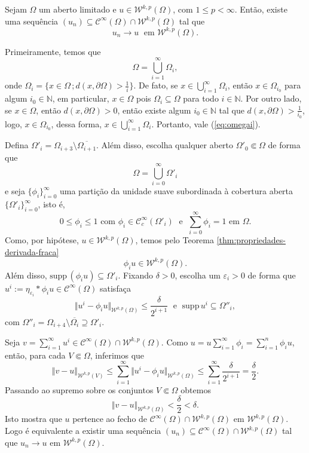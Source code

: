 \documentclass[a4paper, 11pt]{book}
\theoremstyle{definition}
\newcommand{\bN}{\mathbb{N}}
\newcommand{\cC}{\mathcal{C}}
\newcommand{\cW}{\mathcal{W}}
\newcommand{\supp}{\mathrm{supp}\,}
\begin{document}
\begin{tbox} \label{thm:aprox-2}
    Sejam $\Omega$ um aberto limitado e $u \in \cW^{k,p}(\Omega)$, com $1 \leqslant p < \infty$.
    Então, existe uma sequência $(u_n) \subseteq \cC^{\infty}(\Omega) \cap \cW^{k,p}(\Omega)$ tal que
    \[
        u_n \to u \;\text{ em } \cW^{k,p}(\Omega).
    \] 
\end{tbox}
\begin{prf}
    Primeiramente, temos que
    \begin{equation} \label{eq:omegai}
        \Omega = \bigcup_{i=1}^\infty \Omega_i,
    \end{equation}
    onde $\Omega_i = \{x \in \Omega \,; d(x, \partial\Omega) > \tfrac{1}{i}\}$. De fato,
    se $x \in \bigcup_{i=1}^\infty \Omega_i$, então $x \in \Omega_{i_0}$ para algum $i_0 \in \bN$, em particular, $x \in \Omega$ pois $\Omega_i \subseteq \Omega$ para todo $i \in \bN$.
    Por outro lado, se $x \in \Omega$, então $d(x,\partial \Omega) > 0$, então existe algum $i_0 \in \bN$ tal que $d(x, \partial \Omega) > \frac{1}{i_0}$, logo, $x \in \Omega_{i_0}$, dessa forma, $x \in \bigcup_{i=1}^\infty \Omega_i$.
    Portanto, vale (\ref{eq:omegai}). 
    
    Defina $\Omega'_i = \Omega_{i+3} \setminus \overline{\Omega_{i+1}}$.
    Além disso, escolha qualquer aberto $\Omega'_0 \Subset \Omega$ de forma que
    \[
        \Omega = \bigcup_{i=0}^\infty \Omega'_i
    \]
    e seja $\{\phi_i\}_{i=0}^\infty$ uma partição da unidade suave subordinada à cobertura aberta $\{\Omega'_i\}_{i=0}^\infty$, isto é,
    \[
       0 \leqslant \phi_i \leqslant 1 \text{ com } \phi_i \in \cC^\infty_c(\Omega'_i) \;\text{ e }\; \sum_{i=0}^\infty \phi_i = 1 \text{ em } \Omega.
    \]
    Como, por hipótese, $u \in \cW^{k,p}(\Omega)$, temos pelo Teorema \ref{thm:propriedades-derivada-fraca}
    \[
        \phi_i u \in \cW^{k,p}(\Omega).
    \]
    Além disso, $\supp(\phi_i u) \subseteq \Omega'_i$.
    Fixando $\delta > 0$, escolha um $\varepsilon_i > 0$ de forma que $u^i := \eta_{\varepsilon_i} * \phi_i u \in \cC^{\infty}(\Omega)$ satisfaça
    \[
        \Vert u^i - \phi_i u \Vert_{\cW^{k,p}(\Omega)} \leqslant \frac{\delta}{2^{i+1}} \;\text{ e }\; \supp u^i \subseteq \Omega''_i,
    \]
    com $\Omega''_i = \Omega_{i+4} \setminus \overline{\Omega_{i}} \supseteq \Omega'_i$.

    Seja $v = \sum_{i=1}^\infty u^i \in \cC^{\infty}(\Omega) \cap \cW^{k,p}(\Omega)$.
    Como $u = u \sum_{i=1}^\infty \phi_i = \sum_{i=1}^n \phi_i u$, então, para cada $V \Subset \Omega$, inferimos que
    \[
        \Vert v - u \Vert_{\cW^{k,p}(V)} \leqslant \sum_{i=1}^\infty \Vert u^i - \phi_i u \Vert_{\cW^{k,p}(\Omega)} \leqslant \sum_{i=1}^\infty \frac{\delta}{2^{i+1}} = \frac{\delta}{2}.
    \]
    Passando ao supremo sobre os conjuntos $V \Subset \Omega$ obtemos
    \[
        \Vert v - u \Vert_{\cW^{k,p}(\Omega)} < \frac{\delta}{2} < \delta.
    \]
    Isto mostra que $u$ pertence ao fecho de $\cC^\infty(\Omega) \cap \cW^{k,p}(\Omega)$ em $\cW^{k,p}(\Omega)$. Logo é equivalente a existir uma sequência $(u_n) \subseteq \cC^\infty(\Omega) \cap \cW^{k,p}(\Omega)$ tal que $u_n \to u$ em $\cW^{k,p}(\Omega)$.
\end{prf}
\end{document}
